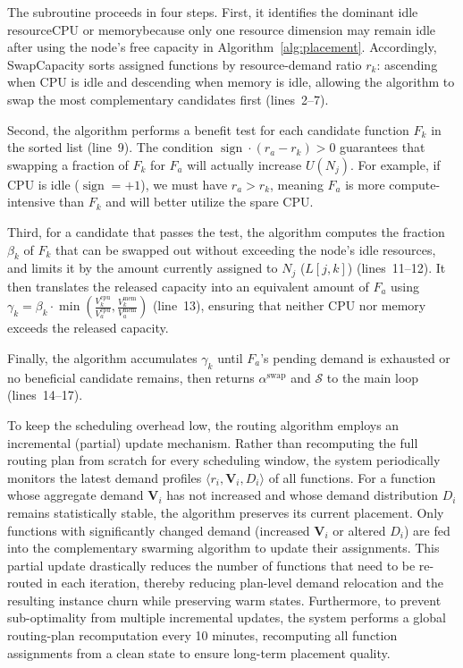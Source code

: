 The subroutine proceeds in four steps. First, it identifies the dominant
idle resource\textemdash CPU or memory\textemdash because only one resource dimension may
remain idle after using the node's free capacity in
Algorithm~\ref{alg:placement}.
Accordingly, SwapCapacity sorts assigned functions by resource-demand ratio
$r_k$: ascending when CPU is idle and descending when memory is idle, allowing
the algorithm to swap the most complementary candidates first (lines~2--7).

Second, the algorithm performs a benefit test for each candidate function $F_k$ in the sorted list (line~9). The condition $\operatorname{sign}\cdot(r_a-r_k) > 0$ 
guarantees that swapping a fraction of $F_k$ for $F_a$ will actually increase 
$U(N_j)$. For example, if CPU is idle ($\operatorname{sign}=+1$), we must have
$r_a > r_k$, meaning $F_a$ is more compute-intensive than $F_k$ and will better 
utilize the spare CPU.

Third, for a candidate that passes the test, the algorithm computes the fraction
$\beta_k$ of $F_k$ that can be swapped out without exceeding the node's idle
resources, and limits it by the amount currently assigned to $N_j$ ($L[j,k]$)
(lines~11--12). It then translates the released capacity into an equivalent
amount of $F_a$ using $\gamma_k = \beta_k \cdot \min\left(\frac{V_k^{\text{cpu}}}{V_a^{\text{cpu}}}, \frac{V_k^{\text{mem}}}{V_a^{\text{mem}}}\right)$
(line~13), ensuring that neither CPU nor memory exceeds the released capacity.

Finally, the algorithm accumulates $\gamma_k$ until $F_a$'s pending demand is
exhausted or no beneficial candidate remains, then returns $\alpha^{\text{swap}}$
and $\mathcal{S}$ to the main loop (lines~14--17).

 To keep the scheduling overhead low, 
the routing algorithm employs an incremental (partial) update mechanism. Rather 
than recomputing the full routing plan from scratch for every scheduling window, the 
system periodically monitors the latest 
demand profiles $\langle r_i, \mathbf{V}_i, D_i \rangle$ of all functions. For 
a function whose aggregate demand $\mathbf{V}_i$ has not increased and whose demand
distribution $D_i$ remains statistically stable, the algorithm preserves its 
current placement. Only functions with significantly changed demand (increased 
$\mathbf{V}_i$ or altered $D_i$) are fed into the complementary swarming algorithm 
to update their assignments. This partial update drastically reduces the number 
of functions that need to be re-routed in each iteration, thereby reducing
plan-level demand relocation and the resulting instance churn while preserving
warm states. Furthermore, to prevent sub-optimality from multiple incremental
updates, the system performs a global routing-plan recomputation every 10 minutes,
recomputing all function assignments from a clean state to ensure long-term
placement quality.

